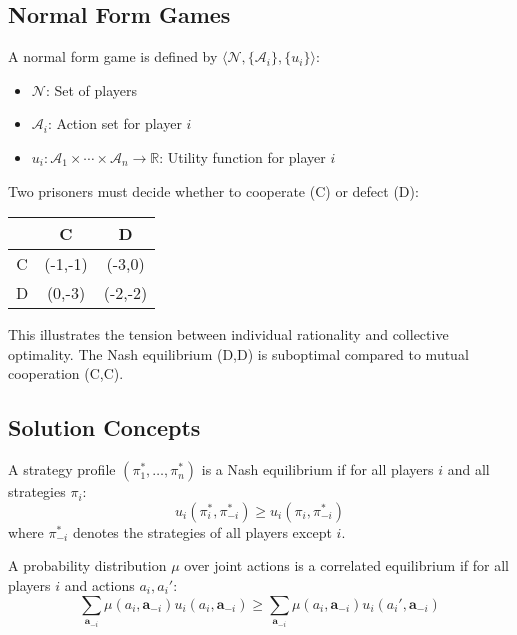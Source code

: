 \subsection{Normal Form Games}

A normal form game is defined by $\langle \mathcal{N}, \{\mathcal{A}_i\}, \{u_i\} \rangle$:
\begin{itemize}
    \item $\mathcal{N}$: Set of players
    \item $\mathcal{A}_i$: Action set for player $i$
    \item $u_i: \mathcal{A}_1 \times \cdots \times \mathcal{A}_n \to \mathbb{R}$: Utility function for player $i$
\end{itemize}

\begin{examplebox}
Two prisoners must decide whether to cooperate (C) or defect (D):

\begin{center}
\begin{tabular}{c|c|c}
 & C & D \\
\hline
C & (-1,-1) & (-3,0) \\
D & (0,-3) & (-2,-2) \\
\end{tabular}
\end{center}

This illustrates the tension between individual rationality and collective optimality. The Nash equilibrium (D,D) is suboptimal compared to mutual cooperation (C,C).
\end{examplebox}

\subsection{Solution Concepts}

\begin{definition}
A strategy profile $(\pi_1^*, \ldots, \pi_n^*)$ is a Nash equilibrium if for all players $i$ and all strategies $\pi_i$:
\begin{equation}
u_i(\pi_i^*, \pi_{-i}^*) \geq u_i(\pi_i, \pi_{-i}^*)
\end{equation}
where $\pi_{-i}^*$ denotes the strategies of all players except $i$.
\end{definition}

\begin{definition}
A probability distribution $\mu$ over joint actions is a correlated equilibrium if for all players $i$ and actions $a_i, a_i'$:
\begin{equation}
\sum_{\mathbf{a}_{-i}} \mu(a_i, \mathbf{a}_{-i}) u_i(a_i, \mathbf{a}_{-i}) \geq \sum_{\mathbf{a}_{-i}} \mu(a_i, \mathbf{a}_{-i}) u_i(a_i', \mathbf{a}_{-i})
\end{equation}
\end{definition}

